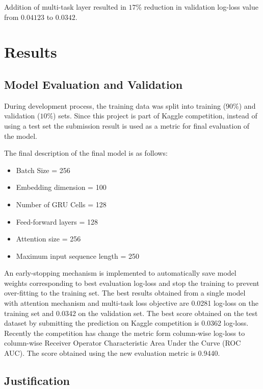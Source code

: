 \documentclass{article}
\begin{document}
        Addition of multi-task layer resulted in $17\%$ reduction in validation log-loss value from $0.04123$ to $0.0342$.

\section{Results}

    \subsection{Model Evaluation and Validation}

    During development process, the training data was split into training ($90\%$) and validation ($10\%$) sets. Since this project is part of Kaggle competition, instead of using a test set the submission result is used as a metric for final evaluation of the model.

    The final description of the final model is as follows:


    \begin{itemize}
        \item Batch Size = 256
        \item Embedding dimension = 100
        \item Number of GRU Cells = 128
        \item Feed-forward layers = 128
        \item Attention size = 256
        \item Maximum input sequence length = 250
    \end{itemize}

    An early-stopping mechanism is implemented to automatically save model weights corresponding to best evaluation log-loss and stop the training to prevent over-fitting to the training set. The best results obtained from a single model with attention mechanism and multi-task loss objective are 0.0281 log-loss on the training set and 0.0342 on the validation set. The best score obtained on the test dataset by submitting the prediction on Kaggle competition is 0.0362 log-loss. Recently the competition has change the metric form column-wise log-loss to column-wise Receiver Operator Characteristic Area Under the Curve (ROC AUC). The score obtained using the new evaluation metric is 0.9440.


    \subsection{Justification}
\end{document}
